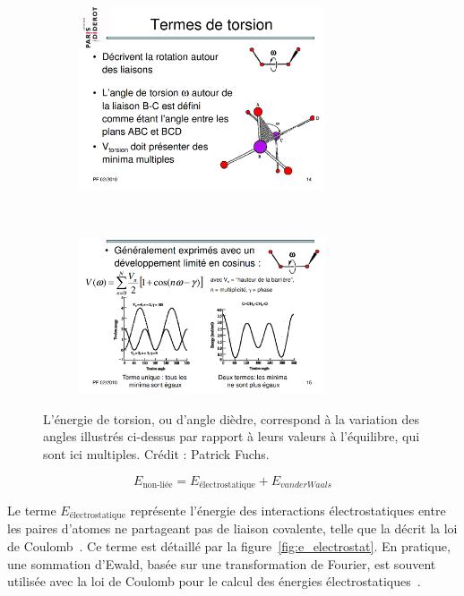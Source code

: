 	\begin{figure}[H]
		\begin{subfigure}{\textwidth}
			\centering
			\includegraphics[width=0.8\textwidth]{./figures/ch1/e_dihedral}
			\label{fig:e_dihedrala}
		\end{subfigure}
		~
		\begin{subfigure}{\textwidth}
			\centering
			\includegraphics[width=0.8\textwidth]{./figures/ch1/e_dihedralb}
			\label{fig:e_dihedralb}
		\end{subfigure}
		\caption[Énergie de torsion, ou d'angles dièdres.]{L'énergie de torsion, ou d'angle dièdre, correspond à la variation des angles illustrés ci-dessus par rapport à leurs valeurs à l'équilibre, qui sont ici multiples. Crédit : Patrick Fuchs.}
		\label{fig:e_dihedral}
	\end{figure}
	
	\begin{equation}
		\label{eq:nonbonded}
		E_\text{non-liée} = E_\text{électrostatique} + E_{van der Waals}
	\end{equation}
	
	Le terme $E_\text{électrostatique}$ représente l'énergie des interactions électrostatiques entre les paires d'atomes ne partageant pas de liaison covalente, telle que la décrit la loi de Coulomb~\cite{coulomb1785premier}. Ce terme est détaillé par la figure~\ref{fig:e_electrostat}. En pratique, une sommation d'Ewald, basée sur une transformation de Fourier, est souvent utilisée avec la loi de Coulomb pour le calcul des énergies électrostatiques~\cite{ewald1921berechnung, essmann1995smooth}.
	
